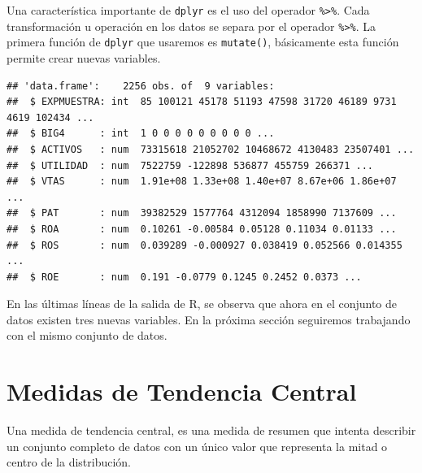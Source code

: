 \documentclass[]{book}
\newenvironment{Shaded}{\begin{snugshade}}{\end{snugshade}}
\newcommand{\DataTypeTok}[1]{\textcolor[rgb]{0.13,0.29,0.53}{#1}}
\newcommand{\KeywordTok}[1]{\textcolor[rgb]{0.13,0.29,0.53}{\textbf{#1}}}
\newcommand{\NormalTok}[1]{#1}
\newcommand{\OperatorTok}[1]{\textcolor[rgb]{0.81,0.36,0.00}{\textbf{#1}}}
\newcommand{\StringTok}[1]{\textcolor[rgb]{0.31,0.60,0.02}{#1}}
\begin{document}
Una característica importante de \texttt{dplyr} es el uso del operador \texttt{\%\textgreater{}\%}. Cada transformación u operación en los datos se separa por el operador \texttt{\%\textgreater{}\%}. La primera función de \texttt{dplyr} que usaremos es \texttt{mutate()}, básicamente esta función permite crear nuevas variables.

\begin{Shaded}
\end{Shaded}

\begin{verbatim}
## 'data.frame':    2256 obs. of  9 variables:
##  $ EXPMUESTRA: int  85 100121 45178 51193 47598 31720 46189 9731 4619 102434 ...
##  $ BIG4      : int  1 0 0 0 0 0 0 0 0 0 ...
##  $ ACTIVOS   : num  73315618 21052702 10468672 4130483 23507401 ...
##  $ UTILIDAD  : num  7522759 -122898 536877 455759 266371 ...
##  $ VTAS      : num  1.91e+08 1.33e+08 1.40e+07 8.67e+06 1.86e+07 ...
##  $ PAT       : num  39382529 1577764 4312094 1858990 7137609 ...
##  $ ROA       : num  0.10261 -0.00584 0.05128 0.11034 0.01133 ...
##  $ ROS       : num  0.039289 -0.000927 0.038419 0.052566 0.014355 ...
##  $ ROE       : num  0.191 -0.0779 0.1245 0.2452 0.0373 ...
\end{verbatim}

En las últimas líneas de la salida de R, se observa que ahora en el conjunto de datos existen tres nuevas variables. En la próxima sección seguiremos trabajando con el mismo conjunto de datos.

\hypertarget{medidas-de-tendencia-central}{%
\section{Medidas de Tendencia Central}\label{medidas-de-tendencia-central}}

Una medida de tendencia central, es una medida de resumen que intenta describir un conjunto completo de datos con un único valor que representa la mitad o centro de la distribución.
\end{document}
